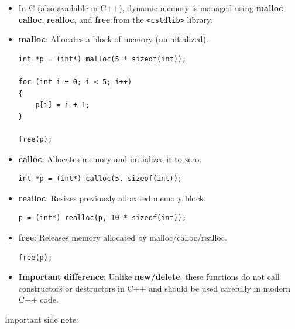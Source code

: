 \documentclass[10pt]{article}
\begin{document}
\begin{itemize}
	\item In C (also available in C++), dynamic memory is managed using \textbf{malloc}, \textbf{calloc}, \textbf{realloc}, and \textbf{free} from the \verb|<cstdlib>| library.

	\item \textbf{malloc}: Allocates a block of memory (uninitialized).
	\begin{verbatim}
int *p = (int*) malloc(5 * sizeof(int));

for (int i = 0; i < 5; i++)
{
    p[i] = i + 1;
}

free(p);
	\end{verbatim}

	\item \textbf{calloc}: Allocates memory and initializes it to zero.
	\begin{verbatim}
int *p = (int*) calloc(5, sizeof(int));
	\end{verbatim}

	\item \textbf{realloc}: Resizes previously allocated memory block.
	\begin{verbatim}
p = (int*) realloc(p, 10 * sizeof(int));
	\end{verbatim}

	\item \textbf{free}: Releases memory allocated by malloc/calloc/realloc.
	\begin{verbatim}
free(p);
	\end{verbatim}

	\item \textbf{Important difference}: Unlike \textbf{new/delete}, these functions do not call constructors or destructors in C++ and should be used carefully in modern C++ code.
\end{itemize}

\newpage

Important side note:
\end{document}
